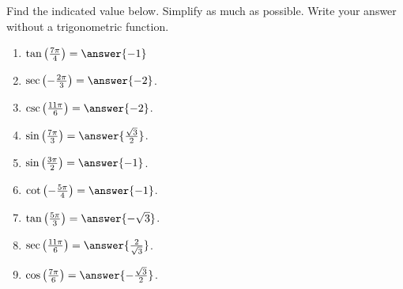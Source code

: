 \documentclass{ximera}
\author{Kenneth Berglund}
\begin{document}
\begin{exercise}
Find the indicated value below. Simplify as much as possible. Write your answer without a trigonometric function.

\begin{enumerate}
\item $\tan\left(\frac{7\pi}{4}\right) = \answer{-1}$

\item $\sec\left(-\frac{2\pi}{3}\right) = \answer{-2}$.

\item $\csc\left(\frac{11\pi}{6}\right) = \answer{-2}$.

\item $\sin\left(\frac{7\pi}{3}\right) = \answer{\frac{\sqrt{3}}{2}}$.

\item $\sin\left(\frac{3\pi}{2}\right) = \answer{-1}$.

\item $\cot\left(-\frac{5\pi}{4}\right) = \answer{-1}$.

\item $\tan\left(\frac{5\pi}{3}\right) = \answer{-\sqrt{3}}$.

\item $\sec\left(\frac{11\pi}{6}\right) = \answer{\frac{2}{\sqrt{3}}}$.

\item $\cos\left(\frac{7\pi}{6}\right) = \answer{-\frac{\sqrt{3}}{2}}$.
\end{enumerate}

\end{exercise}
\end{document}
